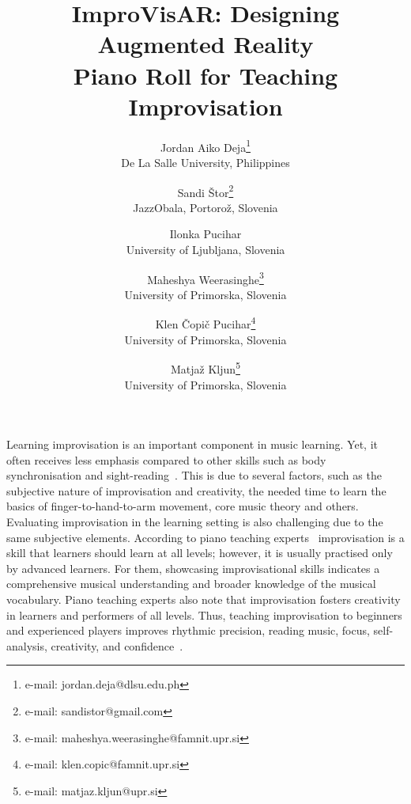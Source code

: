 \documentclass{vgtc}                          %
\title{ImproVisAR: Designing Augmented Reality \\Piano Roll for Teaching Improvisation}
\author{
Jordan Aiko Deja\thanks{e-mail: jordan.deja@dlsu.edu.ph}\\
\scriptsize De La Salle University, Philippines
\and
Sandi Štor\thanks{e-mail: sandistor@gmail.com}\\
\scriptsize JazzObala, Portorož, Slovenia
\and
Ilonka Pucihar\\
\scriptsize University of Ljubljana, Slovenia
\and
Maheshya Weerasinghe\thanks{e-mail: maheshya.weerasinghe@famnit.upr.si}\\
\scriptsize University of Primorska, Slovenia
\and
Klen Čopič Pucihar\thanks{e-mail: klen.copic@famnit.upr.si}\\
\scriptsize University of Primorska, Slovenia
\and
Matjaž Kljun\thanks{e-mail: matjaz.kljun@upr.si}\\
\scriptsize University of Primorska, Slovenia
}
\begin{document}


\maketitle

\par Learning improvisation is an important component in music learning. Yet, it often receives less emphasis compared to other skills such as body synchronisation and sight-reading~\cite{deja2021encouraging}. This is due to several factors, such as the subjective nature of improvisation and creativity, the needed time to learn the basics of finger-to-hand-to-arm movement, core music theory and others. Evaluating improvisation in the learning setting is also challenging due to the same subjective elements. According to piano teaching experts~\cite{deja2022survey} improvisation is a skill that learners should learn at all levels; however, it is usually practised only by advanced learners. For them, showcasing improvisational skills indicates a comprehensive musical understanding and broader knowledge of the musical vocabulary. Piano teaching experts also note that improvisation fosters creativity in learners and performers of all levels. Thus, teaching improvisation to beginners and experienced players improves rhythmic precision, reading music, focus, self-analysis, creativity, and confidence~\cite{chyu2004teaching, burnard2000children, allen2013free}.


\end{document}

